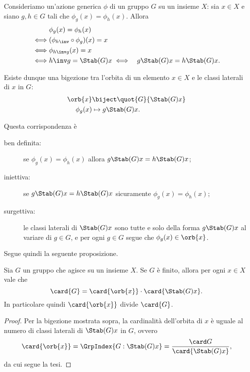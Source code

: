 \begin{remark}
    Consideriamo un'azione generica $\phi$ di un gruppo $G$ su un insieme $X$: sia $x \in X$ e siano $g, h \in G$ tali che $\phi_g(x) = \phi_h(x)$. Allora 
    \begin{align*}
        &\phi_g(x) = \phi_h(x)\\
        \iff &(\phi_{h\inv} \circ \phi_g)(x) = x\\
        \iff &\phi_{h\inv g}(x) = x\\
        \iff &h\inv g = \Stab(G){x}
        \iff &g\Stab(G){x} = h\Stab(G){x}.
    \end{align*}

    Esiste dunque una bigezione tra l'orbita di un elemento $x \in X$ e le classi laterali di $x$ in $G$:
    \begin{align*}
        \orb{x} &\biject \quot{G}{\Stab(G){x}}\\
        \phi_g(x) &\mapsto g\Stab(G){x}.
    \end{align*}

    Questa corrispondenza è
    \begin{description}
        \item[ben definita:] se $\phi_g(x) = \phi_h(x)$ allora $g\Stab(G){x} = h\Stab(G){x}$;
        \item[iniettiva:] se $g\Stab(G){x} = h\Stab(G){x}$ sicuramente $\phi_g(x) = \phi_h(x)$;
        \item[surgettiva:] le classi laterali di $\Stab(G){x}$ sono tutte e solo della forma $g\Stab(G){x}$ al variare di $g \in G$, e per ogni $g \in G$ segue che $\phi_g(x) \in \orb{x}$.
    \end{description}
\end{remark}

Segue quindi la seguente proposizione.
\begin{proposition}
    \label{prop:lem_orb-stab}
    Sia $G$ un gruppo che agisce su un insieme $X$. Se $G$ è finito, allora per ogni $x \in X$ vale che \begin{equation}
        \card{G} = \card{\orb{x}} \cdot \card{\Stab(G){x}}.
    \end{equation}
    In particolare quindi $\card{\orb{x}}$ divide $\card{G}$.
\end{proposition}
\begin{proof}
    Per la bigezione mostrata sopra, la cardinalità dell'orbita di $x$ è uguale al numero di classi laterali di $\Stab(G){x}$ in $G$, ovvero \[
        \card{\orb{x}} = \GrpIndex{G : \Stab(G){x}} = \frac{\card G}{\card{\Stab(G){x}}},    
    \] da cui segue la tesi.
\end{proof}

